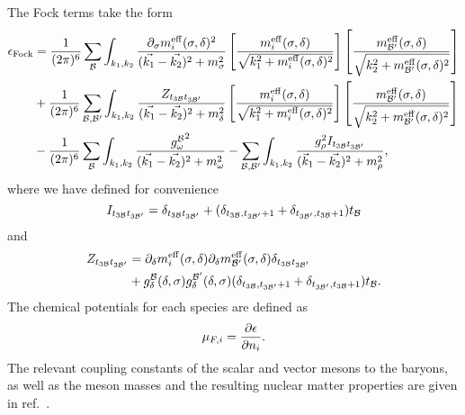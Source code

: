 The Fock terms take the form
%
\begin{equation}
	\begin{split}
		\epsilon_\text{Fock}  & = 
		\frac{1}{(2\pi)^6} \sum_{\cal B} \int_{k_1,k_2} 
		\frac{\partial_\sigma m_i^{\rm eff}(\sigma,\delta)^2}{(\vec{k_1}-\vec{k_2})^2+m_\sigma^2}
		\left[\frac{m_i^{\rm eff}(\sigma,\delta)}{\sqrt{k_1^2+m_i^{\rm eff}(\sigma,\delta)^2}}\right] 
		\left[\frac{m^{\rm eff}_{\cal B'}(\sigma,\delta)}
		{\sqrt{k_2^2+m^{\rm eff}_{\cal B'}(\sigma,\delta)^2}}\right] \\
		&+\frac{1}{(2\pi)^6} \sum_{\cal B,B'} \int_{k_1,k_2}  
		\frac{Z_{t_{3\cal B} t_{3\cal B'}}}{(\vec{k_1}-\vec{k_2})^2+m_\delta^2}
		\left[\frac{m_i^{\rm eff}(\sigma,\delta)}{\sqrt{k_1^2+m_i^{\rm eff}(\sigma,\delta)^2}}\right] 
		\left[\frac{m^{\rm eff}_{\cal B'}(\sigma,\delta)}{\sqrt{k_2^2+m^{\rm eff}_{\cal B'}(\sigma,\delta)^2}}\right]\\
		&-\frac{1}{(2\pi)^6} \sum_{\cal B} \int_{k_1,k_2}  
		\frac{{g^{\cal B}_\omega}^2}{(\vec{k_1} - \vec{k_2})^2 + m_\omega^2} 
		- \sum_{\cal B,B'} \int_{k_1,k_2}  \frac{g_\rho^2 I_{t_{3\cal B} t_{3\cal B'}}}{(\vec k_1 - \vec{k_2})^2 + m_\rho^2}  , 
	\end{split}
\end{equation}
%
where we have defined for convenience
%
	\begin{equation}
	I_{t_{3\cal B} t_{3\cal B'}}
	=  \delta_{t_{3\cal B} t_{3\cal B'}} + {(\delta_{t_{3\cal B}, t_{3\cal B'}+1}+\delta_{t_{3\cal B'}, t_{3\cal B}+1})}{t_{\cal B}} 
	\end{equation}
%
and
%
\begin{equation}
	\begin{split}
		Z_{t_{3\cal B} t_{3\cal B'}}
		&= \partial_\delta m_i^{\rm eff}(\sigma,\delta)\partial_\delta 
		m^{\rm eff}_{\cal B'}(\sigma,\delta)  \delta_{t_{3\cal B} t_{3\cal B'}} \\
		&+ g^{\cal B}_\delta(\delta,\sigma)g^{\cal B'}_\delta(\delta,\sigma)  {(\delta_{t_{3\cal B}, t_{3\cal B'}+1}+\delta_{t_{3\cal B'}, t_{3\cal B}+1})}{t_{\cal B}}.
	\end{split}
\end{equation}
%
The chemical potentials for each species are defined as 
%
\begin{equation}
    \mu_{F,i} = \frac{\partial \epsilon}{\partial n_i} .
\end{equation}
The relevant coupling constants of the scalar and vector mesons to the baryons, as well as the meson masses and the resulting nuclear matter properties are given in ref.~\cite{Motta:2019tjc_Isovectoreffectsneutron}.

